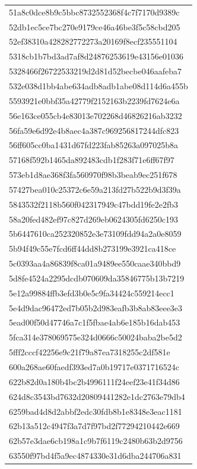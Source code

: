 \begin{tabular}{l}
51a8c0dce8b9c5bbc8732552368f4c7f7170d9389c \\
52db1ec5ce7bc270e9179ce46a46be3f5c58cbd205 \\
52ef38310a428282772273a20169f8ecf235551104 \\
5318cb1b7bd3ad7af8d24876253619e43156e01036 \\
5328466f26722533219d2d81d52becbe046aafeba7 \\
532e038d1bb4abe634adb8adb1abe08d114d6a455b \\
5593921e0bbf35a42779f2152163b2239fd7624e6a \\
56e163ce055cb4e83013e702268d46826216ab3232 \\
56fa59e6d92e4b8aec4a387c969256817244dfc823 \\
56ff605cc0ba1431d67fd223fab85263a097025b8a \\
57168f592b1465da892483cdb1f283f71e6ff67f97 \\
573eb1d8ae368f3fa560970f98b3beab9ec251f678 \\
57427bea010c25372c6e59a213fd27b522b9d3f39a \\
5843532f2118b560f042317949c47bdd19fe2e2fb3 \\
58a20fed482ef97c827d269eb0624305fd6250c193 \\
5b6447610ca252320852e3e73109fdd94a2a0e8059 \\
5b94f49c55e7fcd6ff44dd8b273199e3921ca418ce \\
5c0393aa4a86839f8ca01a9489ee550caae340bbd9 \\
5d8fe4524a2295dcdb070609da35846775b13b7219 \\
5e12a99884ffb3efd3b0e5c9fa34424c559214ecc1 \\
5e4d9dac96472ed7b05b2d983eafb3b8ab83eee3e3 \\
5ead00f50d47746a7c1f5fbae4ab6e185b16dab453 \\
5fca314e378069575e324d0666c50024baba2be5d2 \\
5fff2cccf42256e9c21f79a87ea7318255c2df581e \\
600a268ae60faedf393ed7a0b19717e0371716524c \\
622b82d0a180b4bc2b4996111f24eef23e41f34d86 \\
624d8c3543bd7632d20809441282e1dc2763e79db4 \\
6259bad4d8d2abbf2edc30fdb8b1e8348e3eac1181 \\
62b13a512c4947f3a7d7f97bd2f77294210442e669 \\
62b57e3dae6cb198a1c9b7f6119c2480b63b2d9756 \\
63550f97bd4f5a9ec4874330e31d6dba244706a831 \\

\end{tabular}

